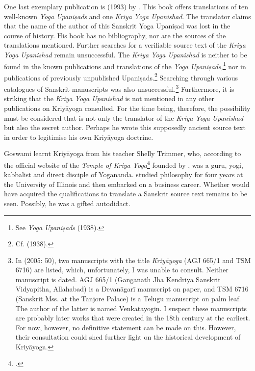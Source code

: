 One last exemplary publication is  (1993) by \citeauthor{kriyayogaupanishad1993}. This book offers translations of ten well-known \textit{Yoga Upaniṣads} and one \textit{Kriya Yoga Upanishad}. The translator claims that the name of the author of this Sanskrit Yoga Upaniṣad was lost in the course of history. His book has no bibliography, nor are the sources of the translations mentioned. Further searches for a verifiable source text of the \textit{Kriya Yoga Upanishad} remain unsuccessful. The \textit{Kriya Yoga Upanishad} is neither to be found in the known publications and translations of the \textit{Yoga Upaniṣads},\footnote{See \emph{Yoga Upaniṣads} (1938).} nor in publications of previously unpublished Upaniṣads.\footnote{Cf.  (1938).} Searching through various catalogues of Sanskrit manuscripts was also unsuccessful.\footnote{In  (2005: 50), two manuscripts with the title \textit{Kriyāyoga} (AGJ 665/1 and TSM 6716) are listed, which, unfortunately, I was unable to consult. Neither manuscript is dated. AGJ 665/1 (Ganganath Jha Kendriya Sanskrit Vidyapitha, Allahabad) is a Devanāgarī manuscript on paper, and TSM 6716 (Sanskrit Mss. at the Tanjore Palace) is a Telugu manuscript on palm leaf. The author of the latter is named Venkaṭayogin. I suspect these manuscripts are probably later works that were created in the 18th century at the earliest. For now, however, no definitive statement can be made on this. However, their consultation could shed further light on the historical development of Kriyāyoga.} Furthermore, it is striking that the \textit{Kriya Yoga Upanishad} is not mentioned in any other publications on Kriyāyoga consulted. For the time being, therefore, the possibility must be considered that \citeauthor{kriyayogaupanishad1993} is not only the translator of the \textit{Kriya Yoga Upanishad} but also the secret author. Perhaps he wrote this supposedly ancient source text in order to legitimise his own Kriyāyoga doctrine.

Goswami \citeauthor{kriyayogaupanishad1993} learnt Kriyāyoga from his teacher Shelly Trimmer, who, according to the official website of the \textit{Temple of Kriya Yoga}\footnote{\cite{goswamikriyananda}.} founded by \citeauthor{kriyayogaupanishad1993}, was a guru, yogi, kabbalist and direct disciple of Yogānanda. \citeauthor{kriyayogaupanishad1993} studied philosophy for four years at the University of Illinois and then embarked on a business career. Whether \citeauthor{kriyayogaupanishad1993} would have acquired the qualifications to translate a Sanskrit source text remains to be seen. Possibly, he was a gifted autodidact.


